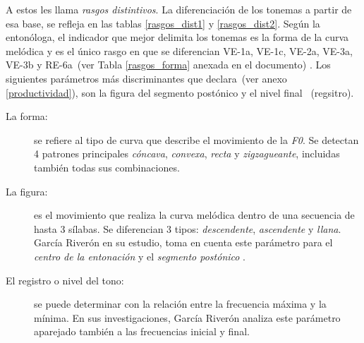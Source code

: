 A estos les llama \emph{rasgos distintivos}. La diferenciaci\'on de los tonemas a partir de esa base, se refleja en las tablas \ref{rasgos_dist1} y \ref{rasgos_dist2}. Seg\'un la enton\'ologa, el indicador que mejor delimita los tonemas es la forma de la curva mel\'odica y es el \'unico rasgo en que se diferencian VE-1a, VE-1c, VE-2a, VE-3a, VE-3b y RE-6a~(ver Tabla \ref{rasgos_forma} anexada en el documento)  \cite[p.247]{garcia1996aspectos2}. Los siguientes par\'ametros m\'as discriminantes que declara~(ver anexo \ref{productividad}), son la figura del segmento post\'onico y el nivel final ~(regsitro).


\begin{description}
\item[La forma:] se refiere al tipo de curva que describe el movimiento de la \emph{F0}. Se detectan 4 patrones principales \emph{c\'oncava}, \emph{convexa}, \emph{recta} y \emph{zigzagueante}, incluidas tambi\'en todas sus combinaciones.
\item[La figura:] es el movimiento que realiza la curva mel\'odica dentro de una secuencia de hasta 3 s\'ilabas. Se diferencian 3 tipos: \emph{descendente}, \emph{ascendente} y \emph{llana}. Garc\'ia River\'on en su estudio, toma en cuenta este par\'ametro para el \emph{centro de la entonaci\'on} y el \emph{segmento post\'onico} \cite[p.214]{garcia1996aspectos2}.
\item[El registro o nivel del tono:] se puede determinar con la relaci\'on entre la frecuencia m\'axima y la m\'inima. En sus investigaciones, Garc\'ia River\'on analiza este par\'ametro aparejado tambi\'en a las frecuencias inicial y final.
\end{description}

